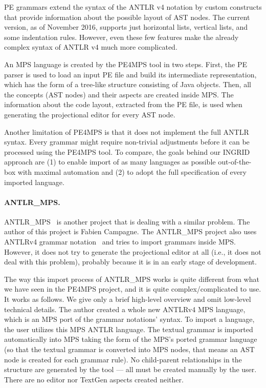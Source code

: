 PE grammars extend the syntax of the ANTLR v4 notation by custom constructs that provide information about the possible layout of AST nodes.
The current version, as of November 2016, supports just horizontal lists, vertical lists, and some indentation rules.
However, even these few features make the already complex syntax of ANTLR v4 much more complicated.

An MPS language is created by the PE4MPS tool in two steps.
First, the PE parser is used to load an input PE file and build its intermediate representation, which has the form of a tree-like structure consisting of Java objects.
Then, all the concepts (AST nodes) and their aspects are created inside MPS.
The information about the code layout, extracted from the PE file, is used when generating the projectional editor for every AST node.

Another limitation of PE4MPS is that it does not implement the full ANTLR syntax.
Every grammar might require non-trivial adjustments before it can be processed using the PE4MPS tool.
To compare, the goals behind our INGRID approach are (1) to enable import of as many languages as possible out-of-the-box with maximal automation and (2) to adopt the full specification of every imported language.








\paragraph{ANTLR{\_}MPS.}
ANTLR{\_}MPS~\cite{ANTLR2MPS} is another project that is dealing with a similar problem.
The author of this project is Fabien Campagne.
The ANTLR{\_}MPS project also uses ANTLRv4 grammar notation~\cite{ANTLR4} and tries to import grammars inside MPS.
However, it does not try to generate the projectional editor at all (i.e., it does not deal with this problem), probably because it is in an early stage of development.

The way this import process of ANTLR{\_}MPS works is quite different from what we have seen in the PE4MPS project, and it is quite complex/complicated to use.
It works as follows. We give only a brief high-level overview and omit low-level technical details.
The author created a whole new ANTLRv4 MPS language, which is an MPS port of the grammar notations' syntax.
To import a language, the user utilizes this MPS ANTLR language.
The textual grammar is imported automatically into MPS taking the form of the MPS's ported grammar language (so that the textual grammar is converted into MPS nodes, that means an AST node is created for each grammar rule).
No child-parent relationships in the structure are generated by the tool --- all must be created manually by the user.
There are no editor nor TextGen aspects created neither.

